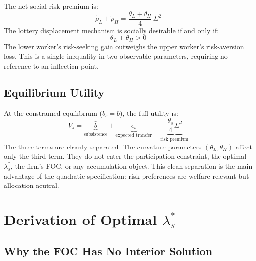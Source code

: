 \documentclass[12pt,a4paper]{article}
\begin{document}
The net social risk premium is:
\begin{equation}
  \tilde\rho_L + \tilde\rho_H
  = \frac{\theta_L + \theta_H}{4}\,\Sigma^2
  \label{eq:social_premium}
\end{equation}
The lottery displacement mechanism is socially desirable if and only if:
\begin{equation}
  \theta_L + \theta_H > 0
  \label{eq:social_condition}
\end{equation}
The lower worker's risk-seeking gain outweighs the upper worker's
risk-aversion loss. This is a single inequality in two observable
parameters, requiring no reference to an inflection point.

\subsection{Equilibrium Utility}

At the constrained equilibrium ($b_s = \bar{b}$), the full utility
is:
\begin{equation}
  V_s = \underbrace{\bar{b}}_{\text{subsistence}}
      + \underbrace{\epsilon_s}_{\text{expected transfer}}
      + \underbrace{\frac{\theta_s}{4}\Sigma^2}_{\text{risk premium}}
  \label{eq:V_final}
\end{equation}
The three terms are cleanly separated. The curvature parameters
$(\theta_L, \theta_H)$ affect only the third term. They do not enter
the participation constraint, the optimal $\lambda_s^*$, the firm's
FOC, or any accumulation object. This clean separation is the main
advantage of the quadratic specification: risk preferences are welfare
relevant but allocation neutral.

\section{Derivation of Optimal $\lambda_s^*$}

\subsection{Why the FOC Has No Interior Solution}
\end{document}
